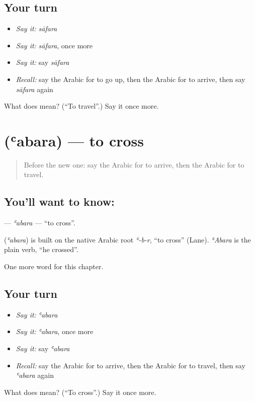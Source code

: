 \subsection*{Your turn}
\begin{itemize}
\raggedright
  \item \emph{Say it:} \emph{sāfara}
  \item \emph{Say it:} \emph{sāfara}, once more
  \item \emph{Say it:} say \emph{sāfara}
  \item \emph{Recall:} say the Arabic for to go up, then the Arabic for to arrive, then say \emph{sāfara} again
\end{itemize}

\begin{tcolorbox}[breakable,colback=teal!4,colframe=teal!35!black,title={Before you move on}]
What does  mean? (\textquotedblleft{}To travel\textquotedblright{}.) Say it once more.
\end{tcolorbox}
\section[\texorpdfstring{\ar{عبر} (ʿabara)}{عبر (ʿabara)}]{ (ʿabara) — to cross}

\label{lesson:AR-C159-abara}



\begin{quote}
Before the new one: say the Arabic for to arrive, then the Arabic for to travel.
\end{quote}

\subsection*{You'll want to know: }
\textbf{} — \emph{ʿabara} — \textquotedblleft{}to cross\textquotedblright{}.

\begin{cousinweb}
\textbf{} (\emph{ʿabara}) is built on the native Arabic root \emph{ʿ-b-r}, \textquotedblleft{}to cross\textquotedblright{} (Lane). \emph{ʿAbara} is the plain verb, \textquotedblleft{}he crossed\textquotedblright{}.
\end{cousinweb}

\begin{grammarlens}[title={What you've built}]
One more word for this chapter.
\end{grammarlens}

\subsection*{Your turn}
\begin{itemize}
\raggedright
  \item \emph{Say it:} \emph{ʿabara}
  \item \emph{Say it:} \emph{ʿabara}, once more
  \item \emph{Say it:} say \emph{ʿabara}
  \item \emph{Recall:} say the Arabic for to arrive, then the Arabic for to travel, then say \emph{ʿabara} again
\end{itemize}

\begin{tcolorbox}[breakable,colback=teal!4,colframe=teal!35!black,title={Before you move on}]
What does  mean? (\textquotedblleft{}To cross\textquotedblright{}.) Say it once more.
\end{tcolorbox}
